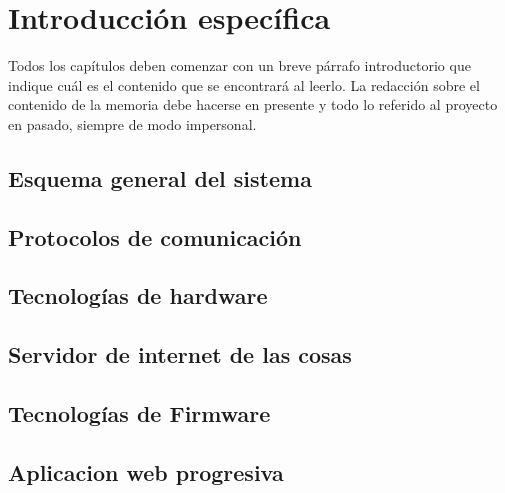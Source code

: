 \chapter{Introducción específica} %

\label{Chapter2}

Todos los capítulos deben comenzar con un breve párrafo introductorio que indique cuál es el contenido que se encontrará al leerlo.  La redacción sobre el contenido de la memoria debe hacerse en presente y todo lo referido al proyecto en pasado, siempre de modo impersonal.

\section{Esquema general del sistema}

\section{Protocolos de comunicación}


\section{Tecnologías de hardware}

\section{Servidor de internet de las cosas}

\section{Tecnologías de Firmware}

\section{Aplicacion web progresiva}




